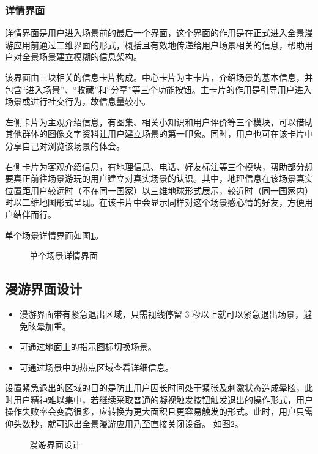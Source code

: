 \subsubsection{详情界面}
详情界面是用户进入场景前的最后一个界面，这个界面的作用是在正式进入全景漫游应用前通过二维界面的形式，概括且有效地传递给用户场景相关的信息，帮助用户对全景场景建立模糊的信息架构。

该界面由三块相关的信息卡片构成。中心卡片为主卡片，介绍场景的基本信息，并包含“进入场景”、“收藏”和“分享”等三个功能按钮。主卡片的作用是引导用户进入场景或进行社交行为，故信息量较小。

左侧卡片为主观介绍信息，有图集、相关小知识和用户评价等三个模块，可以借助其他群体的图像文字资料让用户建立场景的第一印象。同时，用户也可在该卡片中分享自己对浏览该场景的体会。

右侧卡片为客观介绍信息，有地理信息、电话、好友标注等三个模块，帮助部分想要真正前往场景游玩的用户建立对真实场景的认识。其中，地理信息在该场景真实位置距用户较远时（不在同一国家）以三维地球形式展示，较近时（同一国家内）时以二维地图形式呈现。在该卡片中会显示同样对这个场景感心情的好友，方便用户结伴而行。

单个场景详情界面如图\ref{fig:d-07}。

\begin{figure}[htp]
\centering
{}
\caption{单个场景详情界面}
\label{fig:d-07}
\end{figure}

\subsection{漫游界面设计}
\begin{itemize}
	\item 漫游界面带有紧急退出区域，只需视线停留 3 秒以上就可以紧急退出场景，避免眩晕加重。
	\item 可通过地面上的指示图标切换场景。
	\item 可通过场景中的热点区域查看详细信息。
\end{itemize}

设置紧急退出的区域的目的是防止用户因长时间处于紧张及刺激状态造成晕眩，此时用户精神难以集中，若继续采取普通的凝视触发按钮触发退出的操作形式，用户操作失败率会变高很多，应转换为更大面积且更容易触发的形式。此时，用户只需仰头数秒，就可退出全景漫游应用乃至直接关闭设备。
如图\ref{fig:scenery}。

\begin{figure}[htp]
\centering
{}
\caption{漫游界面设计}
\label{fig:scenery}
\end{figure}

